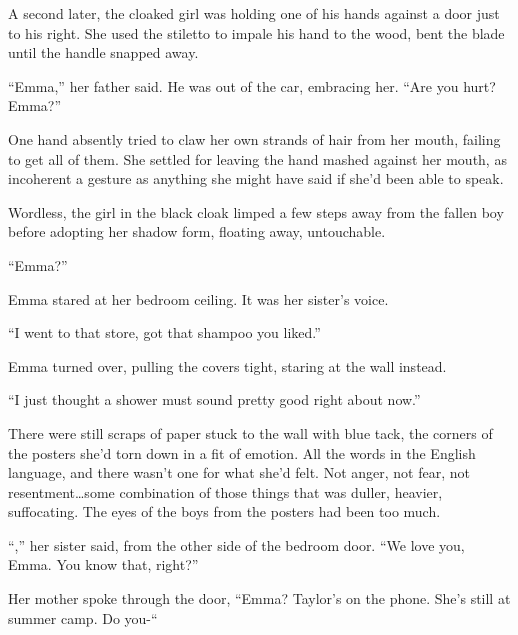 A second later, the cloaked girl was holding one of his hands against a door just to his right.  She used the stiletto to impale his hand to the wood, bent the blade until the handle snapped away.



``Emma,'' her father said.  He was out of the car, embracing her.  ``Are you hurt?  Emma?''



One hand absently tried to claw her own strands of hair from her mouth, failing to get all of them.  She settled for leaving the hand mashed against her mouth, as incoherent a gesture as anything she might have said if she'd been able to speak.



Wordless, the girl in the black cloak limped a few steps away from the fallen boy before adopting her shadow form, floating away, untouchable.



\sectionbreak



``Emma?''



Emma stared at her bedroom ceiling.  It was her sister's voice.



``I went to that store, got that shampoo you liked.''



Emma turned over, pulling the covers tight, staring at the wall instead.



``I just thought a shower must sound pretty good right about now.''



There were still scraps of paper stuck to the wall with blue tack, the corners of the posters she'd torn down in a fit of emotion.  All the words in the English language, and there wasn't one for what she'd felt.  Not anger, not fear, not resentment\ldots some combination of those things that was duller, heavier, suffocating.  The eyes of the boys from the posters had been too much.



``\ldotsOkay,'' her sister said, from the other side of the bedroom door.  ``We love you, Emma.  You know that, right?''



\sectionbreak



Her mother spoke through the door, ``Emma?  Taylor's on the phone.  She's still at summer camp.  Do you-``



